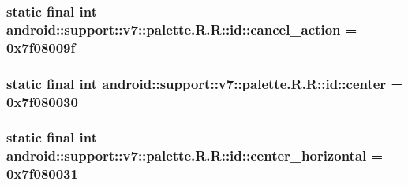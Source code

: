 \hypertarget{classandroid_1_1support_1_1v7_1_1palette_1_1_r_1_1id_6a499733b6d28c5ba84dad1ac8756088}{
\subsubsection[{cancel\_\-action}]{\setlength{\rightskip}{0pt plus 5cm}static final int android::support::v7::palette.R.R::id::cancel\_\-action = 0x7f08009f}}
\label{classandroid_1_1support_1_1v7_1_1palette_1_1_r_1_1id_6a499733b6d28c5ba84dad1ac8756088}


\hypertarget{classandroid_1_1support_1_1v7_1_1palette_1_1_r_1_1id_089f57cf7fe56c4f0aebd13ff3ae3431}{
\subsubsection[{center}]{\setlength{\rightskip}{0pt plus 5cm}static final int android::support::v7::palette.R.R::id::center = 0x7f080030}}
\label{classandroid_1_1support_1_1v7_1_1palette_1_1_r_1_1id_089f57cf7fe56c4f0aebd13ff3ae3431}


\hypertarget{classandroid_1_1support_1_1v7_1_1palette_1_1_r_1_1id_3b694e4733bbe4e14801704e87a44950}{
\subsubsection[{center\_\-horizontal}]{\setlength{\rightskip}{0pt plus 5cm}static final int android::support::v7::palette.R.R::id::center\_\-horizontal = 0x7f080031}}
\label{classandroid_1_1support_1_1v7_1_1palette_1_1_r_1_1id_3b694e4733bbe4e14801704e87a44950}



